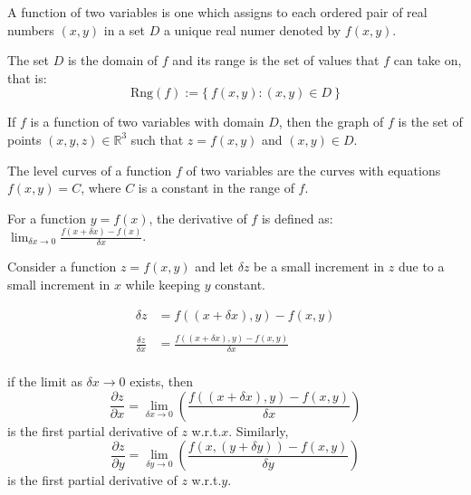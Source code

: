 

A function of two variables is one which assigns to each ordered pair of real numbers $(x,y)$ in a set $D$ a unique real numer denoted by $f(x,y)$.

The set $D$ is the domain of $f$ and its range is the set of values that $f$ can take on, that is: \[\text{Rng}(f) :=  \{\ f(x,y) : (x,y) \in D\ \}\]

\begin{definition}
	If $f$ is a function of two variables with domain $D$, then the graph of $f$ is the set of points $(x,y,z) \in \mathbb{R}^3$ such that $z = f(x,y)$ and $(x,y) \in D$.
\end{definition}

\begin{definition}
	The level curves of a function $f$ of two variables are the curves with
	equations $f(x,y) = C$, where $C$ is a constant in the range of $f$.
\end{definition}

\begin{recall}
	For a function $y=f(x)$, the derivative of $f$ is defined as:
	$\lim_{\delta x \to 0} \frac{f(x + \delta x) - f(x)}{\delta x}$.
\end{recall}

Consider a function $z = f(x,y)$ and let $\delta z$ be a small increment in $z$ 
due to a small increment in $x$ while keeping $y$ constant.

\begin{align*}
	\delta z &= f((x+\delta x), y) - f(x,y)\\\\
	\frac{\delta z}{\delta x} &= \frac{f((x + \delta x), y) - f(x,y)}{\delta x}\\
\end{align*}

if the limit as $\delta x \to 0$ exists, then
\[
  \frac{\partial z}{\partial x} = 
  \lim_{\delta x \to 0} \left( \frac{f((x + \delta x), y) - f(x,y)}{\delta x} \right)
\]
is the first partial derivative of $z$ w.r.t.$x$. Similarly,
\[
  \frac{\partial z}{\partial y} = 
  \lim_{\delta y \to 0} \left( \frac{f\left(x, (y + \delta y)\right) - f(x,y)}{\delta y} \right)
\]
is the first partial derivative of $z$ w.r.t.$y$.




